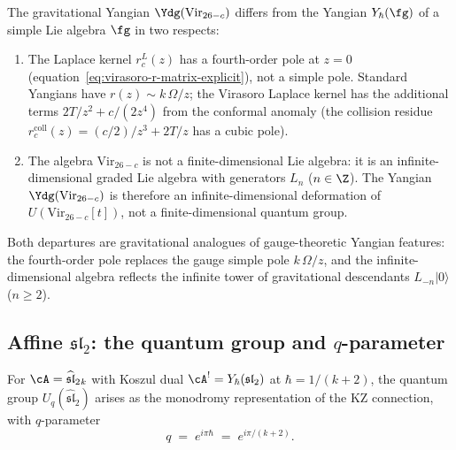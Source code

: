 \begin{remark}
The gravitational Yangian $\Ydg(\mathrm{Vir}_{26-c})$
differs from the Yangian $Y_\hbar(\fg)$ of a simple Lie
algebra $\fg$ in two respects:
\begin{enumerate}[label=(\roman*)]
\item The Laplace kernel $r^L_c(z)$ has a fourth-order pole
 at $z=0$ (equation~\eqref{eq:virasoro-r-matrix-explicit}),
 not a simple pole. Standard Yangians have
 $r(z)\sim k\,\Omega/z$; the Virasoro Laplace kernel has the
 additional terms $2T/z^2+c/(2z^4)$ from the conformal
 anomaly (the collision residue $r^{\mathrm{coll}}_c(z) =
 (c/2)/z^3 + 2T/z$ has a cubic pole).
\item The algebra $\mathrm{Vir}_{26-c}$ is not a
 finite-dimensional Lie algebra: it is an infinite-dimensional
 graded Lie algebra with generators $L_n$ ($n\in\Z$).
 The Yangian $\Ydg(\mathrm{Vir}_{26-c})$ is therefore
 an infinite-dimensional deformation of $U(\mathrm{Vir}_{26-c}[t])$,
 not a finite-dimensional quantum group.
\end{enumerate}
Both departures are gravitational analogues of gauge-theoretic
Yangian features: the fourth-order pole replaces the gauge
simple pole $k\,\Omega/z$, and the infinite-dimensional algebra
reflects the infinite tower of gravitational descendants
$L_{-n}|0\rangle$ ($n\ge 2$).
\end{remark}

\subsection{Affine $\mathfrak{sl}_2$: the quantum group
and $q$-parameter}

\begin{theorem}
For $\cA=\widehat{\mathfrak{sl}}_2{}_k$ with Koszul dual
$\cA^!=Y_\hbar(\mathfrak{sl}_2)$ at
$\hbar=1/(k+2)$, the quantum group
$U_q(\widehat{\mathfrak{sl}}_2)$ arises as the
monodromy representation of the KZ connection, with
$q$-parameter
\begin{equation}
q\;=\;e^{i\pi\hbar}\;=\;e^{i\pi/(k+2)}.
\end{equation}
\end{theorem}

